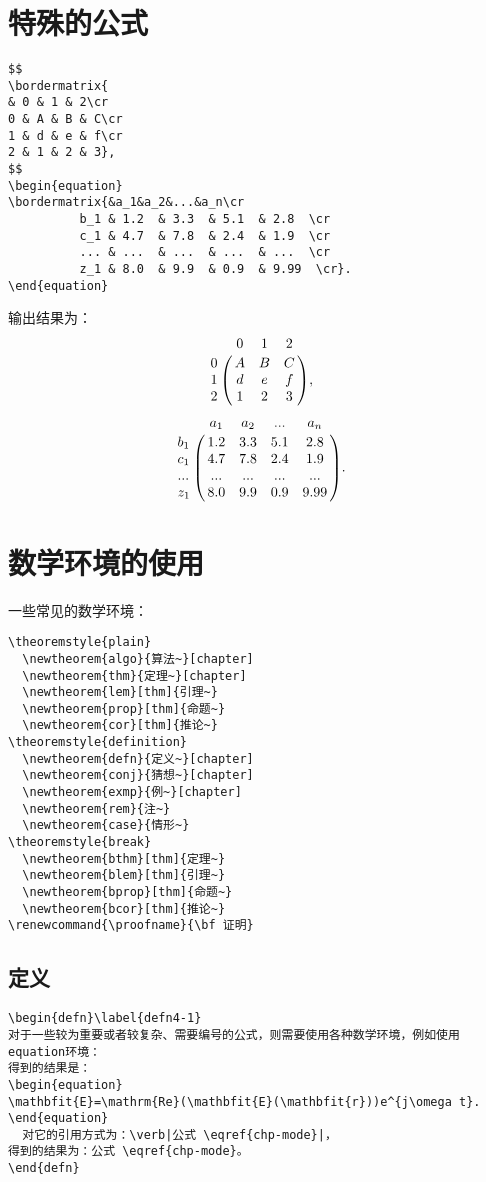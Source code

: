 \section{特殊的公式}\label{section4-8}
\begin{verbatim}
$$
\bordermatrix{
& 0 & 1 & 2\cr
0 & A & B & C\cr
1 & d & e & f\cr
2 & 1 & 2 & 3},
$$
\begin{equation}
\bordermatrix{&a_1&a_2&...&a_n\cr
          b_1 & 1.2  & 3.3  & 5.1  & 2.8  \cr
          c_1 & 4.7  & 7.8  & 2.4  & 1.9  \cr
          ... & ...  & ...  & ...  & ...  \cr
          z_1 & 8.0  & 9.9  & 0.9  & 9.99  \cr}.
\end{equation}
\end{verbatim}
输出结果为：
$$
\bordermatrix{
& 0 & 1 & 2\cr
0 & A & B & C\cr
1 & d & e & f\cr
2 & 1 & 2 & 3},
$$
\begin{equation}
\bordermatrix{&a_1&a_2&...&a_n\cr
          b_1 & 1.2  & 3.3  & 5.1  & 2.8  \cr
          c_1 & 4.7  & 7.8  & 2.4  & 1.9  \cr
          ... & ...  & ...  & ...  & ...  \cr
          z_1 & 8.0  & 9.9  & 0.9  & 9.99  \cr}.
\end{equation}

\section{数学环境的使用}\label{section4-9}


一些常见的数学环境：
\begin{verbatim}
\theoremstyle{plain}
  \newtheorem{algo}{算法~}[chapter]
  \newtheorem{thm}{定理~}[chapter]
  \newtheorem{lem}[thm]{引理~}
  \newtheorem{prop}[thm]{命题~}
  \newtheorem{cor}[thm]{推论~}
\theoremstyle{definition}
  \newtheorem{defn}{定义~}[chapter]
  \newtheorem{conj}{猜想~}[chapter]
  \newtheorem{exmp}{例~}[chapter]
  \newtheorem{rem}{注~}
  \newtheorem{case}{情形~}
\theoremstyle{break}
  \newtheorem{bthm}[thm]{定理~}
  \newtheorem{blem}[thm]{引理~}
  \newtheorem{bprop}[thm]{命题~}
  \newtheorem{bcor}[thm]{推论~}
\renewcommand{\proofname}{\bf 证明}
\end{verbatim}

\subsection{定义}\label{defn}
\begin{verbatim}
\begin{defn}\label{defn4-1}
对于一些较为重要或者较复杂、需要编号的公式，则需要使用各种数学环境，例如使用equation环境：
得到的结果是：
\begin{equation}
\mathbfit{E}=\mathrm{Re}(\mathbfit{E}(\mathbfit{r}))e^{j\omega t}.
\end{equation}
  对它的引用方式为：\verb|公式 \eqref{chp-mode}|，
得到的结果为：公式 \eqref{chp-mode}。
\end{defn}
\end{verbatim}

